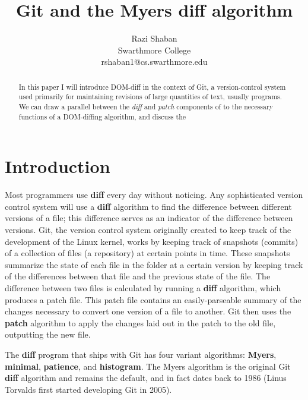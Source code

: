 \documentclass[11pt,letterpaper]{article}
\begin{document}
\newcommand{\diff}{\textbf{diff} }
\newcommand{\patch}{\textbf{patch} }

\date{}

\title{Git and the Myers diff algorithm}

\author{
    Razi Shaban\\
    Swarthmore College\\
    rshaban1@cs.swarthmore.edu
}

\maketitle

\begin{abstract}
In this paper I will introduce DOM-diff in the context of Git, a version-control system used primarily for maintaining revisions of large quantities of text, usually programs. We can draw a parallel between the \emph{diff} and \emph{patch} components of  to the necessary functions of a DOM-diffing algorithm, and discuss the

\end{abstract}

\section{Introduction}

Most programmers use \diff every day without noticing. Any sophisticated version control system will use a \diff algorithm to find the difference between different versions of a file; this difference serves as an indicator of the difference between versions. Git, the version control system originally created to keep track of the development of the Linux kernel, works by keeping track of snapshots (commits) of a collection of files (a repository) at certain points in time. These snapshots summarize the state of each file in the folder at a certain version by keeping track of the differences between that file and the previous state of the file. The difference between two files is calculated by running a \diff algorithm, which produces a patch file. This patch file contains an easily-parseable summary of the changes necessary to convert one version of a file to another. Git then uses the \patch algorithm to apply the changes laid out in the patch to the old file, outputting the new file. 

The \diff program that ships with Git has four variant algorithms: \textbf{Myers}, \textbf{minimal}, \textbf{patience}, and \textbf{histogram}. The Myers algorithm is the original Git \diff algorithm and remains the default, and in fact dates back to 1986 (Linus Torvalds first started developing Git in 2005). 
\end{document}
